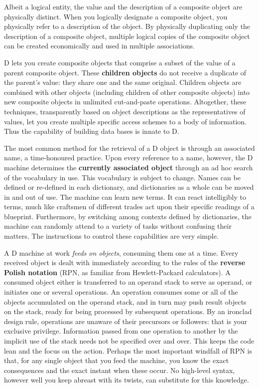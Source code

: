 Albeit  a logical entity,  the value and the description of a  composite object are physically distinct.  When you logically designate a composite object,  you  physically  refer  to  a  description  of  the  object.  By physically  duplicating  only  the description  of  a  composite  object, multiple   logical  copies  of  the  composite  object  can  be   created economically and used in multiple associations.

D  lets you create composite objects that comprise a subset  of  the value of a parent composite object. These \textbf{children objects} do not receive a duplicate of the parent's value:  they share one and the same original. Children  objects are combined with other objects (including children  of other composite objects) into new composite objects in unlimited cut-and-paste operations.  Altogether,  these techniques,  transparently based on object  descriptions  as the representatives of values,  let  you  create multiple specific access schemes to a body of information. Thus the capability of building data bases is innate to D.

The  most  common method for the retrieval of a D object is  through  an associated  name,  a time-honoured practice.  Upon every reference  to  a name,  however,  the D machine determines the \textbf{currently associated object} through  an ad hoc search of the vocabulary in use.  This  vocabulary  is subject to change. Names can be defined or re-defined in each dictionary, and  dictionaries as a whole can be moved in and out of  use.  The machine  can  learn new  terms. It can react intelligibly to terms, much like craftsmen of different trades act upon their specific readings of a blueprint.  Furthermore,  by switching among contexts defined by dictionaries, the machine can randomly attend to a variety of tasks without confusing their matters.  The instructions to  control  these capabilities are very simple. 

A  D  machine at work \emph{feeds on objects},  consuming them one at  a  time. Every received object is dealt with immediately according to the rules of the  \textbf{reverse  Polish  notation} (RPN,  as  familiar  from  Hewlett-Packard calculators). A consumed object either is transferred to an operand stack to serve as operand, or initiates one or several operations. An operation consumes some or all of the objects accumulated on the operand stack, and in turn may push result objects on the stack,  ready for being  processed by  subsequent operations.  By an ironclad design  rule,  operations  are unaware  of  their  precursors  or  followers: that  is  your  exclusive privilege.  Information  passed  from one operation to  another  by  the implicit  use of the stack needs not be specified over and over.  This keeps  the  code lean and the focus on the action.  Perhaps the most important windfall of RPN is that, for any single object that you feed the machine, you know  the exact consequences and the exact instant when these occur.  No high-level syntax, however well you keep abreast with its twists, can substitute for this knowledge.

